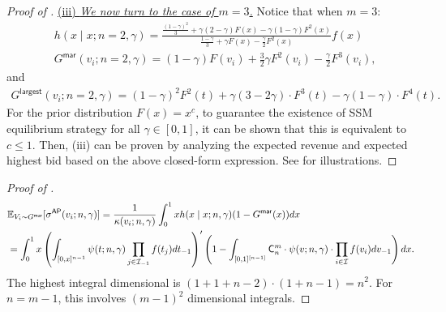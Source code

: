 \begin{proof}[{Proof of }]
\medskip

\noindent
\underline{(iii) \textit{We now turn to the case of $m=3$.}}
Notice that when $m=3$:
\begin{align*}
   & h\left(x\mid x;n = 2,\gamma\right)  = \frac{\frac{(1-\gamma)^2}{3} + \gamma(2-\gamma) F(x) - \gamma(1-\gamma)F^2(x)}{\frac{1-\gamma}{3} + \gamma F(x) - \frac{\gamma}{2}F^2(x)}f(x)\\
    & G^{\mathsf{mar}}(v_i;n=2,\gamma) = (1-\gamma) F(v_i) + \frac{3}{2} \gamma F^2(v_i)  - \frac{\gamma}{2}F^3(v_i),
\end{align*}
and 
\begin{align*}
 G^{\mathsf{largest}}(v_i;n=2,\gamma)=
 (1-\gamma)^2 F^2(t) + \gamma(3-2\gamma)\cdot F^3(t)
 -\gamma(1-\gamma)\cdot F^4(t).   
\end{align*}
For the prior distribution $F(x)=x^c$, to guarantee the existence of SSM equilibrium strategy for all $\gamma\in [0,1]$, it can be shown that this is equivalent to $c\leq 1$.
Then, 
 (iii) can be proven by analyzing the expected revenue and expected highest bid based on the above closed-form expression.
See  for illustrations.
\end{proof}



\begin{proof}[Proof of ]
    \begin{align*}
  &\mathbb{E}_{V_i\sim G^{\mathsf{mar}}}[\sigma^{\mathsf{AP}}(v_i;n,\gamma)]
 = \frac{1}{\kappa(v_i;n,\gamma)}\int_0^1 x h(x\mid x;n,\gamma)  (1-G^{\mathsf{mar}}(x))dx\\
  &=
  \int_0^1 x 
\left(\int_{[0,x]^{n-1}}\psi(t;n,\gamma)\prod_{j\in \mathcal{I}_{-1}}f(t_j) dt_{-1}\right)^\prime
  \left (1-
  \int_{[0,1]^{[n-1]}}\mathsf{C}^m_n\cdot \psi(v;n,\gamma)\cdot \prod_{i\in \mathcal{I}}f(v_i)dv_{-1} 
  \right)dx. 
\end{align*}
The highest integral dimensional is $(1+1+n-2)\cdot (1+n-1) = n^2$.
For $n=m-1$, this involves $(m-1)^2$ dimensional integrals. 
\end{proof}

